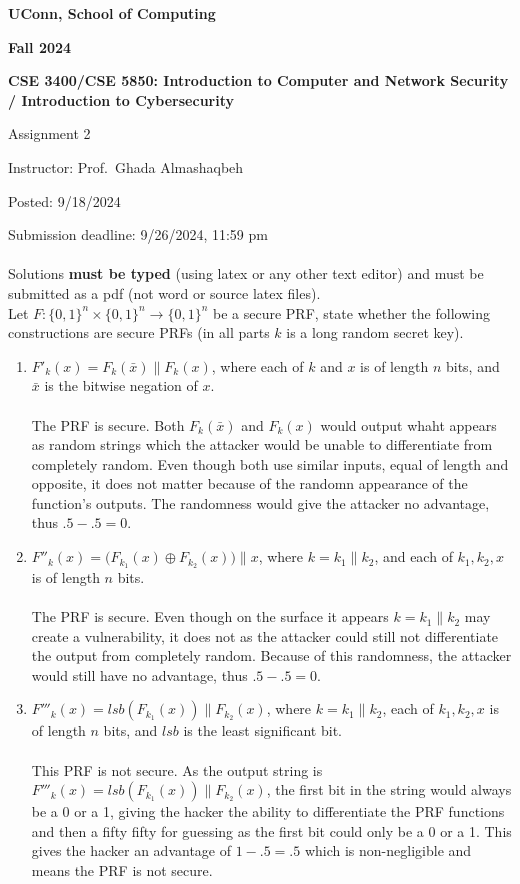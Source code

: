 \documentclass[12pt]{article}
\newcommand{\zo}{\{0,1\}}
\newcommand*\concat{\mathbin{\|}}
\newcommand\xor{\oplus}
\newcommand{\handout}[2]{
\renewcommand{\thepage}{\footnotesize CSE 3400/CSE 5850, #1, p. \arabic{page}}
\begin{center}

\noindent
{\bf UConn, School of Computing}

\noindent
{\bf Fall 2024}

\noindent
{\bf CSE 3400/CSE 5850: Introduction to Computer and Network Security \\/ Introduction to Cybersecurity}
\end{center}

\begin{center}
{\Large #1}
\end{center}
}
\begin{document}
\handout{Assignment 2}{}

\noindent
{Instructor: Prof.~Ghada Almashaqbeh}

\noindent
{Posted: 9/18/2024}

\noindent
{Submission deadline: 9/26/2024, 11:59 pm} \\\\

 Solutions {\bf must be typed} (using latex or any other text editor) and must be submitted as a pdf (not word or source latex files).\\

Let $F:\zo^n \times \zo^n \to \zo^n$ be a secure PRF, state whether the following constructions are secure PRFs (in all parts $k$ is a long random secret key).

\begin{enumerate}
\item $F'_k(x) = F_k(\bar{x}) \concat F_k(x)$, where each of $k$ and $x$ is of length $n$ bits, and $\bar{x}$ is the bitwise negation of $x$.
\\\\The PRF is secure. Both $F_k(\bar{x})$ and $F_k(x)$ would output whaht appears as random strings which the attacker
would be unable to differentiate from completely random. Even though both use similar inputs, equal of length and opposite,
it does not matter because of the randomn appearance of the function's outputs. The randomness would give the attacker no advantage,
thus \(.5 - .5 = 0\).

\item $F''_k(x) = \big(F_{k_1}(x) \xor F_{k_2}(x)\big) \concat x$, where $k = k_1 \concat k_2$, and each of $k_1, k_2, x$ is of length $n$ bits.
\\\\The PRF is secure. Even though on the surface it appears $k = k_1 \concat k_2$ may create a vulnerability,
it does not as the attacker could still not differentiate the output from completely random. Because of this randomness,
the attacker would still have no advantage, thus \(.5 - .5 = 0\).

\item $F'''_k(x) = lsb(F_{k_1}(x)) \concat F_{k_2}(x)$, where $k = k_1 \concat k_2$, each of $k_1, k_2, x$ is of length $n$ bits, and $lsb$ is the least significant bit.
\\\\This PRF is not secure. As the output string is $F'''_k(x) = lsb(F_{k_1}(x)) \concat F_{k_2}(x)$, the first bit in the string
would always be a 0 or a 1, giving the hacker the ability to differentiate the PRF functions and then a fifty fifty for guessing
as the first bit could only be a 0 or a 1. This gives the hacker an advantage of $1 - .5 = .5$ which is non-negligible and means
the PRF is not secure. 

\end{enumerate}
\end{document}
